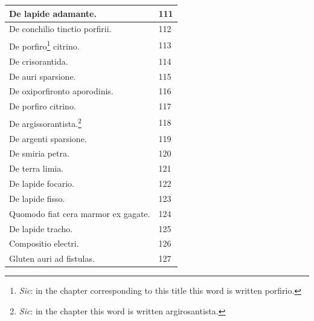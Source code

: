 \documentclass[a4paper, 11pt, oneside, polutonikogreek, italian]{article}
\begin{document}
\begin{center}
\begin{longtable}{|p{60mm}|l|}
         De lapide adamante.                                                             & 111 \\ \hline
         De conchilio tinctio porfirii.                                                  & 112 \\ \hline
         De porfiro\footnote{\emph{Sic}: in the chapter corresponding to this title this word is written porfirio.} citrino.                                                            & 113 \\ \hline
         De crisorantida.                                                                & 114 \\ \hline
         De auri sparsione.                                                              & 115 \\ \hline
         De oxiporfironto aporodinis.                                                    & 116 \\ \hline
         De porfiro citrino.                                                             & 117 \\ \hline
         De argissorantista.\footnote{\emph{Sic}: in the chapter this word is written argirosantista.}                                                         & 118 \\ \hline
         De argenti sparsione.                                                           & 119 \\ \hline
         De smiria petra.                                                                & 120 \\ \hline
         De terra limia.                                                                 & 121 \\ \hline
         De lapide focario.                                                              & 122 \\ \hline
         De lapide fisso.                                                                & 123 \\ \hline
         Quomodo fiat cera marmor ex gagate.                                             & 124 \\ \hline
         De lapide tracho.                                                               & 125 \\ \hline
         Compositio electri.                                                             & 126 \\ \hline
         Gluten auri ad fistulas.                                                        & 127 \\ \hline

\end{longtable}
\end{center}
\end{document}
